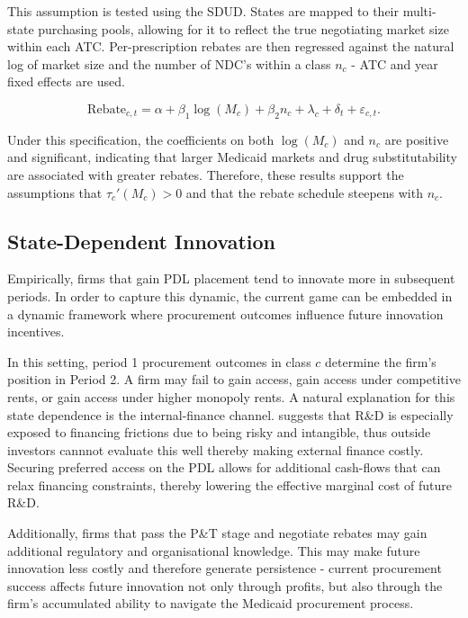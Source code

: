 \documentclass[12pt]{article}
\begin{document}
This assumption is tested using the SDUD. States are mapped to their multi-state purchasing pools, allowing for it to reflect the true negotiating  market size within each ATC. Per-prescription rebates are then regressed against the natural log of market size and the number of NDC's within a class $n_c$ - ATC and year fixed effects are used. 

\begin{equation}
    \text{Rebate}_{c,t} = \alpha + \beta_1 \log(M_c) + \beta_2 n_c + \lambda_c + \delta_t + \varepsilon_{c,t}.
\end{equation}

Under this specification, the coefficients on both $\log(M_c)$ and $n_c$ are positive and significant, indicating that larger Medicaid markets and drug substitutability are associated with greater rebates. Therefore, these results support the assumptions that $\tau_c'(M_c)>0$ and that the rebate schedule steepens with $n_c$.

\subsection{State-Dependent Innovation}
Empirically, firms that gain PDL placement tend to innovate more in subsequent periods. In order to capture this dynamic, the current game can be embedded in a dynamic framework where procurement outcomes influence future innovation incentives.

In this setting, period 1 procurement outcomes in class $c$ determine the firm's position in Period 2. A firm may fail to gain access, gain access under competitive rents, or gain access under higher monopoly rents. A natural explanation for this state dependence is the internal-finance channel. \cite{hal2002financing} suggests that R\&D is especially exposed to financing frictions due to being risky and intangible, thus outside investors cannnot evaluate this well thereby making external finance costly. Securing preferred access on the PDL allows for additional cash-flows that can relax financing constraints, thereby lowering the effective marginal cost of future R\&D.

Additionally, firms that pass the P\&T stage and negotiate rebates may gain additional regulatory and organisational knowledge. This may make future innovation less costly and therefore generate persistence - current procurement success affects future innovation not only through profits, but also through the firm's accumulated ability to navigate the Medicaid procurement process.
\end{document}
